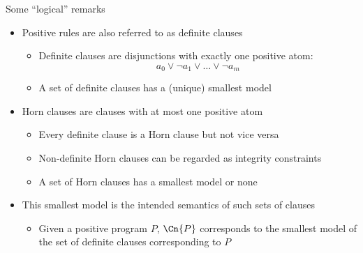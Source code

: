 \begin{frame}{Some ``logical'' remarks}
  \begin{itemize}
  \item <1-> Positive rules are also referred to as \alert<1-2>{definite clauses}
    \begin{itemize}
    \item Definite clauses are disjunctions with \alert<1>{exactly one} positive atom:
      \[
      a_0\vee\neg a_1\vee\dots\vee\neg a_m
      \]
    \item A set of definite clauses has a (unique) \alert<3>{smallest model}
    \end{itemize}
    \medskip
  \item<2-> \alert<2>{Horn clauses} are clauses with \alert<2>{at most} one positive atom
    \begin{itemize}
    \item Every definite clause is a Horn clause but not vice versa
    \item Non-definite Horn clauses can be regarded as integrity constraints
      \smallskip
    \item A set of Horn clauses has a \alert<3>{smallest model} or none
    \end{itemize}
    \medskip
  \item<3-> This \alert<3>{smallest model} is the intended semantics of such sets of clauses
    \begin{itemize}
    \item Given a positive program $P$,
    $\Cn{P}$ corresponds to the smallest model of the set of
    definite clauses corresponding to $P$
  \end{itemize}
\end{itemize}
\end{frame}
%
